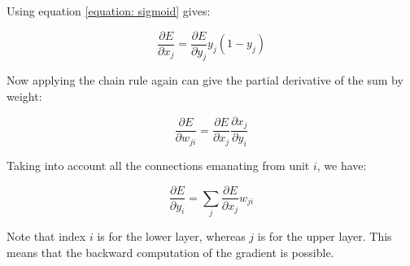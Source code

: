 \documentclass{article}
\begin{document}
Using equation \ref{equation: sigmoid} gives:

\begin{equation}
    \frac{\partial E}{\partial x_j} = \frac{\partial E}{\partial y_j} y_j(1-y_j)
    \label{equation: chain sigmoid}
\end{equation}

Now applying the chain rule again can give the partial derivative of the sum by weight:

\begin{equation}
    \frac{\partial E}{\partial w_{ji}} = \frac{\partial E}{\partial x_j} \frac{\partial x_j}{\partial y_i}
    \label{equation: weight error}
\end{equation}

Taking into account all the connections emanating from unit $i$, we have:

\begin{equation}
    \frac{\partial E}{\partial y_i} = \sum_{j}^{} {\frac{\partial E}{\partial x_j} w_{ji}}
    \label{equation: back prop}
\end{equation}

Note that index $i$ is for the lower layer, whereas $j$ is for the upper layer.
This means that the backward computation of the gradient is possible.
\end{document}
